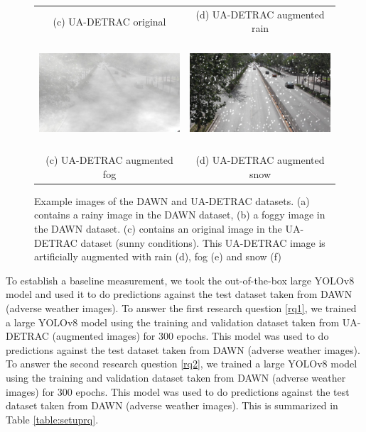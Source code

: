 \documentclass[]{article}
\begin{document}
\begin{figure}
\begin{tabular}{cc}
		(c) UA-DETRAC original  & (d) UA-DETRAC augmented rain \\[6pt]
		\includegraphics[width=65mm, height=40mm]{detrac-fog-fullres.png} &   \includegraphics[width=65mm, height=40mm]{detrac-snow-fullres.png} \\
		(c) UA-DETRAC augmented fog & (d) UA-DETRAC augmented snow \\[6pt]
	\end{tabular}
	\caption{Example images of the DAWN and UA-DETRAC datasets.  (a) contains a rainy image in the DAWN dataset, (b) a foggy image in the DAWN dataset.  (c) contains an original image in the UA-DETRAC dataset (sunny conditions).  This UA-DETRAC image is artificially augmented with rain (d), fog (e) and snow (f)  }
	\label{fig:example-images}
\end{figure}

To establish a baseline measurement, we took the out-of-the-box large YOLO{\small v8} model and used it to do predictions against the test dataset taken from DAWN (adverse weather images).  To answer the first research question \ref{rq1}, we trained a large YOLO{\small v8} model using the training and validation dataset taken from UA-DETRAC (augmented images) for 300 epochs.  This model was used to do predictions against the test dataset taken from DAWN (adverse weather images).  To answer the second research question \ref{rq2}, we trained a large YOLO{\small v8} model using the training and validation dataset taken from DAWN (adverse weather images) for 300 epochs.  This model was used to do predictions against the test dataset taken from DAWN (adverse weather images).  This is summarized in Table \ref{table:setuprq}.
\end{document}
